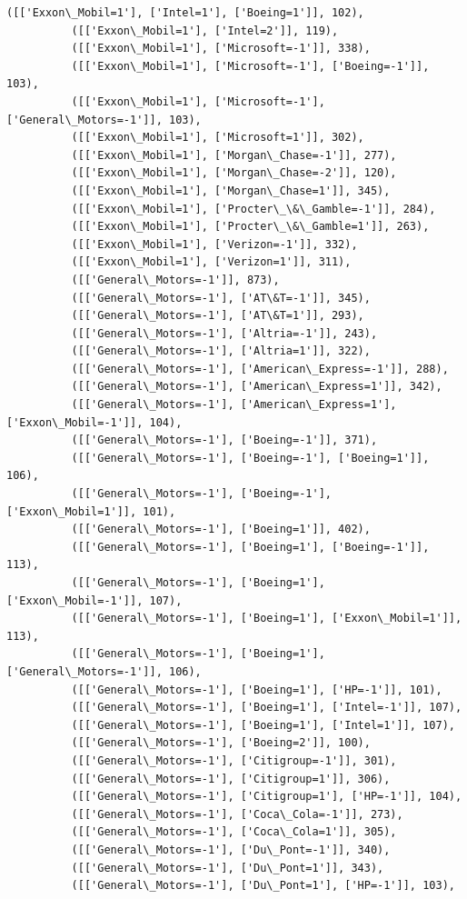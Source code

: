 \documentclass[11pt]{article}
\begin{document}
\begin{Verbatim}[commandchars=\\\{\}]
          ([['Exxon\_Mobil=1'], ['Intel=1'], ['Boeing=1']], 102),
          ([['Exxon\_Mobil=1'], ['Intel=2']], 119),
          ([['Exxon\_Mobil=1'], ['Microsoft=-1']], 338),
          ([['Exxon\_Mobil=1'], ['Microsoft=-1'], ['Boeing=-1']], 103),
          ([['Exxon\_Mobil=1'], ['Microsoft=-1'], ['General\_Motors=-1']], 103),
          ([['Exxon\_Mobil=1'], ['Microsoft=1']], 302),
          ([['Exxon\_Mobil=1'], ['Morgan\_Chase=-1']], 277),
          ([['Exxon\_Mobil=1'], ['Morgan\_Chase=-2']], 120),
          ([['Exxon\_Mobil=1'], ['Morgan\_Chase=1']], 345),
          ([['Exxon\_Mobil=1'], ['Procter\_\&\_Gamble=-1']], 284),
          ([['Exxon\_Mobil=1'], ['Procter\_\&\_Gamble=1']], 263),
          ([['Exxon\_Mobil=1'], ['Verizon=-1']], 332),
          ([['Exxon\_Mobil=1'], ['Verizon=1']], 311),
          ([['General\_Motors=-1']], 873),
          ([['General\_Motors=-1'], ['AT\&T=-1']], 345),
          ([['General\_Motors=-1'], ['AT\&T=1']], 293),
          ([['General\_Motors=-1'], ['Altria=-1']], 243),
          ([['General\_Motors=-1'], ['Altria=1']], 322),
          ([['General\_Motors=-1'], ['American\_Express=-1']], 288),
          ([['General\_Motors=-1'], ['American\_Express=1']], 342),
          ([['General\_Motors=-1'], ['American\_Express=1'], ['Exxon\_Mobil=-1']], 104),
          ([['General\_Motors=-1'], ['Boeing=-1']], 371),
          ([['General\_Motors=-1'], ['Boeing=-1'], ['Boeing=1']], 106),
          ([['General\_Motors=-1'], ['Boeing=-1'], ['Exxon\_Mobil=1']], 101),
          ([['General\_Motors=-1'], ['Boeing=1']], 402),
          ([['General\_Motors=-1'], ['Boeing=1'], ['Boeing=-1']], 113),
          ([['General\_Motors=-1'], ['Boeing=1'], ['Exxon\_Mobil=-1']], 107),
          ([['General\_Motors=-1'], ['Boeing=1'], ['Exxon\_Mobil=1']], 113),
          ([['General\_Motors=-1'], ['Boeing=1'], ['General\_Motors=-1']], 106),
          ([['General\_Motors=-1'], ['Boeing=1'], ['HP=-1']], 101),
          ([['General\_Motors=-1'], ['Boeing=1'], ['Intel=-1']], 107),
          ([['General\_Motors=-1'], ['Boeing=1'], ['Intel=1']], 107),
          ([['General\_Motors=-1'], ['Boeing=2']], 100),
          ([['General\_Motors=-1'], ['Citigroup=-1']], 301),
          ([['General\_Motors=-1'], ['Citigroup=1']], 306),
          ([['General\_Motors=-1'], ['Citigroup=1'], ['HP=-1']], 104),
          ([['General\_Motors=-1'], ['Coca\_Cola=-1']], 273),
          ([['General\_Motors=-1'], ['Coca\_Cola=1']], 305),
          ([['General\_Motors=-1'], ['Du\_Pont=-1']], 340),
          ([['General\_Motors=-1'], ['Du\_Pont=1']], 343),
          ([['General\_Motors=-1'], ['Du\_Pont=1'], ['HP=-1']], 103),

\end{Verbatim}
\end{document}
